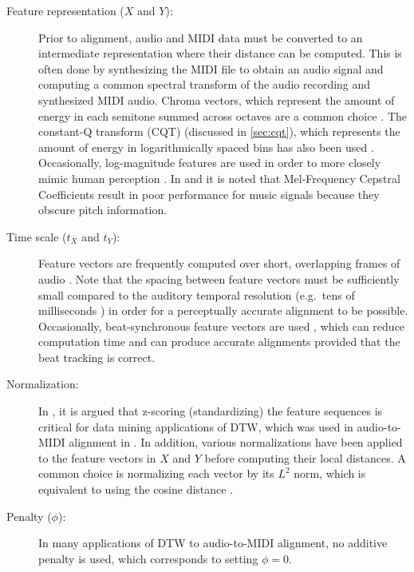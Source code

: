 \begin{description}
\item[Feature representation ($X$ and $Y$):] Prior to alignment, audio and MIDI data must be converted to an intermediate representation where their distance can be computed.
This is often done by synthesizing the MIDI file to obtain an audio signal and computing a common spectral transform of the audio recording and synthesized MIDI audio.
Chroma vectors, which represent the amount of energy in each semitone summed across octaves \cite{fujishima1999realtime} are a common choice \cite{hu2003polyphonic, ewert2012towards}.
The constant-Q transform (CQT) (discussed in \cref{sec:cqt}), which represents the amount of energy in logarithmically spaced bins \cite{brown1991calculation} has also been used \cite{raffel2015large, dixon2005match, ellis2013aligning}.
Occasionally, log-magnitude features are used in order to more closely mimic human perception \cite{raffel2015large, ellis2013aligning, turetsky2003ground}.
In \cite{turetsky2003ground} and \cite{hu2003polyphonic} it is noted that Mel-Frequency Cepstral Coefficients result in poor performance for music signals because they obscure pitch information.
\item[Time scale ($t_X$ and $t_Y$):] Feature vectors are frequently computed over short, overlapping frames of audio \cite{dixon2005match, turetsky2003ground, hu2003polyphonic}.
Note that the spacing between feature vectors must be sufficiently small compared to the auditory temporal resolution (e.g.\ tens of milliseconds \cite{blauert1997spatial}) in order for a perceptually accurate alignment to be possible.
Occasionally, beat-synchronous feature vectors are used \cite{raffel2015large,ellis2013aligning}, which can reduce computation time and can produce accurate alignments provided that the beat tracking is correct.
\item[Normalization:] In \cite{rakthanmanon2012searching}, it is argued that z-scoring (standardizing) the feature sequences is critical for data mining applications of DTW, which was used in audio-to-MIDI alignment in \cite{hu2003polyphonic}.
In addition, various normalizations have been applied to the feature vectors in $X$ and $Y$ before computing their local distances.
A common choice is normalizing each vector by its $L^2$ norm, which is equivalent to using the cosine distance \cite{turetsky2003ground, ewert2012towards, raffel2015large, ellis2013aligning}.
\item[Penalty ($\phi$):] In many applications of DTW to audio-to-MIDI alignment, no additive penalty is used, which corresponds to setting $\phi = 0$.

\end{description}
